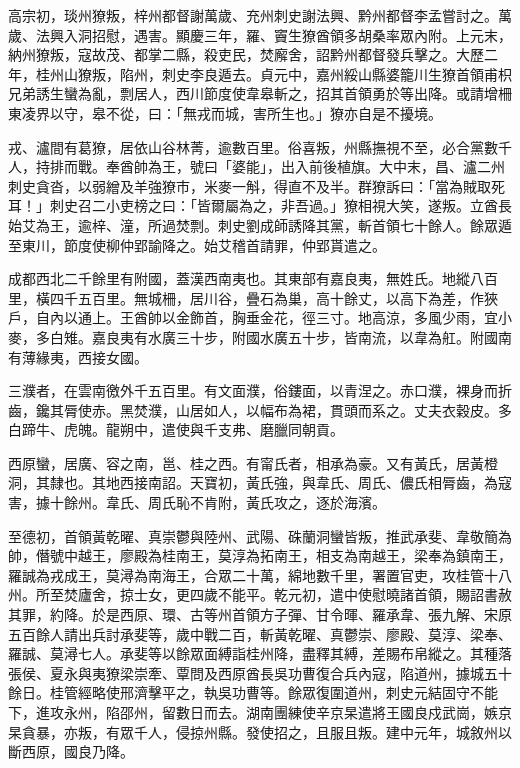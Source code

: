\begin{pinyinscope}
 高宗初，琰州獠叛，梓州都督謝萬歲、充州刺史謝法興、黔州都督李孟嘗討之。萬歲、法興入洞招慰，遇害。顯慶三年，羅、竇生獠酋領多胡桑率眾內附。上元末，納州獠叛，寇故茂、都掌二縣，殺吏民，焚廨舍，詔黔州都督發兵擊之。大歷二年，桂州山獠叛，陷州，刺史李良遁去。貞元中，嘉州綏山縣婆籠川生獠首領甫枳兄弟誘生蠻為亂，剽居人，西川節度使韋皋斬之，招其首領勇於等出降。或請增柵東凌界以守，皋不從，曰：「無戎而城，害所生也。」獠亦自是不擾境。



 戎、瀘間有葛獠，居依山谷林菁，逾數百里。俗喜叛，州縣撫視不至，必合黨數千人，持排而戰。奉酋帥為王，號曰「婆能」，出入前後植旗。大中末，昌、瀘二州刺史貪沓，以弱繒及羊強獠市，米麥一斛，得直不及半。群獠訴曰：「當為賊取死耳！」刺史召二小吏榜之曰：「皆爾屬為之，非吾過。」獠相視大笑，遂叛。立酋長始艾為王，逾梓、潼，所過焚剽。刺史劉成師誘降其黨，斬首領七十餘人。餘眾遁至東川，節度使柳仲郢諭降之。始艾稽首請罪，仲郢貰遣之。



 成都西北二千餘里有附國，蓋漢西南夷也。其東部有嘉良夷，無姓氏。地縱八百里，橫四千五百里。無城柵，居川谷，疊石為巢，高十餘丈，以高下為差，作狹戶，自內以通上。王酋帥以金飾首，胸垂金花，徑三寸。地高涼，多風少雨，宜小麥，多白雉。嘉良夷有水廣三十步，附國水廣五十步，皆南流，以韋為舡。附國南有薄緣夷，西接女國。



 三濮者，在雲南徼外千五百里。有文面濮，俗鏤面，以青涅之。赤口濮，裸身而折齒，鑱其脣使赤。黑焚濮，山居如人，以幅布為裙，貫頭而系之。丈夫衣穀皮。多白蹄牛、虎魄。龍朔中，遣使與千支弗、磨臘同朝貢。



 西原蠻，居廣、容之南，邕、桂之西。有甯氏者，相承為豪。又有黃氏，居黃橙洞，其隸也。其地西接南詔。天寶初，黃氏強，與韋氏、周氏、儂氏相脣齒，為寇害，據十餘州。韋氏、周氏恥不肯附，黃氏攻之，逐於海濱。



 至德初，首領黃乾曜、真崇鬱與陸州、武陽、硃蘭洞蠻皆叛，推武承斐、韋敬簡為帥，僭號中越王，廖殿為桂南王，莫淳為拓南王，相支為南越王，梁奉為鎮南王，羅誠為戎成王，莫潯為南海王，合眾二十萬，綿地數千里，署置官吏，攻桂管十八州。所至焚廬舍，掠士女，更四歲不能平。乾元初，遣中使慰曉諸首領，賜詔書赦其罪，約降。於是西原、環、古等州首領方子彈、甘令暉、羅承韋、張九解、宋原五百餘人請出兵討承斐等，歲中戰二百，斬黃乾曜、真鬱崇、廖殿、莫淳、梁奉、羅誠、莫潯七人。承斐等以餘眾面縛詣桂州降，盡釋其縛，差賜布帛縱之。其種落張侯、夏永與夷獠梁崇牽、覃問及西原酋長吳功曹復合兵內寇，陷道州，據城五十餘日。桂管經略使邢濟擊平之，執吳功曹等。餘眾復圍道州，刺史元結固守不能下，進攻永州，陷邵州，留數日而去。湖南團練使辛京杲遣將王國良戍武崗，嫉京杲貪暴，亦叛，有眾千人，侵掠州縣。發使招之，且服且叛。建中元年，城敘州以斷西原，國良乃降。




\end{pinyinscope}
